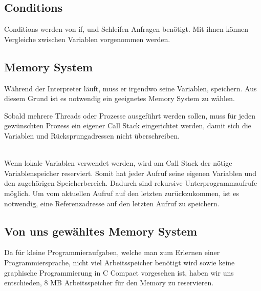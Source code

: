 \subsection{Conditions}
Conditions werden von if, und Schleifen Anfragen benötigt. Mit ihnen können Vergleiche zwischen Variablen vorgenommen werden.



\subsection{Memory System}
\label{sec:memory_system}
Während der Interpreter läuft, muss er irgendwo seine Variablen, speichern. Aus diesem Grund ist es notwendig ein geeignetes Memory System zu wählen.


Sobald mehrere Threads oder Prozesse ausgeführt werden sollen, muss für jeden gewünschten Prozess ein eigener Call Stack eingerichtet
werden, damit sich die Variablen und Rücksprungadressen nicht überschreiben.

\\
Wenn lokale Variablen verwendet werden, wird am Call Stack der nötige Variablenspeicher reserviert. Somit hat jeder Aufruf seine eigenen Variablen und den zugehörigen Speicherbereich. Dadurch sind rekursive Unterprogrammaufrufe möglich. Um vom aktuellen Aufruf auf den letzten zurückzukommen, ist es notwendig, eine Referenzadresse auf den letzten Aufruf zu speichern.

\subsection{Von uns gewähltes Memory System}
Da für kleine Programmieraufgaben, welche man zum Erlernen einer Programmiersprache, nicht viel Arbeitsspeicher benötigt wird sowie keine graphische Programmierung in C Compact vorgesehen ist, haben wir uns entschieden, 8 MB Arbeitsspeicher für den Memory zu reservieren.

